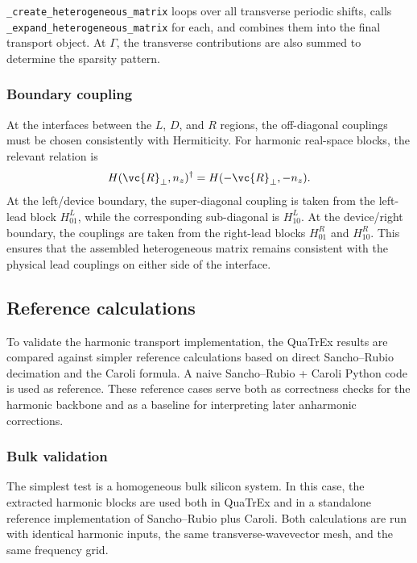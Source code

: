 \texttt{\_create\_heterogeneous\_matrix} loops over all transverse
periodic shifts, calls \texttt{\_expand\_heterogeneous\_matrix} for
each, and combines them into the final transport object.  At $\Gamma$,
the transverse contributions are also summed to determine the sparsity
pattern.

\subsubsection{Boundary coupling}

At the interfaces between the $L$, $D$, and $R$ regions, the
off-diagonal couplings must be chosen consistently with Hermiticity.
For harmonic real-space blocks, the relevant relation is
\begin{equation}\label{eq:hermiticity_perp}
  H(\vc{R}_\perp,n_z)^\dagger
  = H(-\vc{R}_\perp,-n_z).
\end{equation}
At the left/device boundary, the super-diagonal coupling is taken from
the left-lead block $H_{01}^L$, while the corresponding sub-diagonal is
$H_{10}^L$.  At the device/right boundary, the couplings are taken from
the right-lead blocks $H_{01}^R$ and $H_{10}^R$.  This ensures that the
assembled heterogeneous matrix remains consistent with the physical lead
couplings on either side of the interface.

\subsection{Reference calculations}
\label{sec:validation}

To validate the harmonic transport implementation, the QuaTrEx results
are compared against simpler reference calculations based on direct
Sancho--Rubio decimation and the Caroli formula.  A naive
Sancho--Rubio + Caroli Python code is used as reference.  These
reference cases serve both as correctness checks for the harmonic
backbone and as a baseline for interpreting later anharmonic
corrections.

\subsubsection{Bulk validation}
\label{sec:bulk_validation}

The simplest test is a homogeneous bulk silicon system.  In this case,
the extracted harmonic blocks are used both in QuaTrEx and in a
standalone reference implementation of Sancho--Rubio plus Caroli.  Both
calculations are run with identical harmonic inputs, the same
transverse-wavevector mesh, and the same frequency grid.


